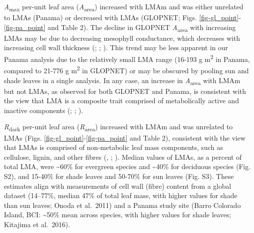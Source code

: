\documentclass[
  12pt,
  letterpaper,
  DIV=11,
  numbers=noendperiod]{scrartcl}
\begin{document}
\emph{A}\textsubscript{max} per-unit leaf area
(\emph{A}\textsubscript{area}) increased with LMAm and was either
unrelated to LMAs (Panama) or decreased with LMAs (GLOPNET; Figs.
\ref{fig-gl_point}-\ref{fig-pa_point} and Table 2). The decline in
GLOPNET \emph{A}\textsubscript{area} with increasing LMAs may be due to
decreasing mesophyll conductance, which decreases with increasing cell
wall thickness (;
;
). This trend may be
less apparent in our Panama analysis due to the relatively small LMA
range (16-193 g m\textsuperscript{2} in Panama, compared to 21-776 g
m\textsuperscript{2} in GLOPNET) or may be obscured by pooling sun and
shade leaves in a single analysis. In any case, an increase in
\emph{A}\textsubscript{area} with LMAm but not LMAs, as observed for
both GLOPNET and Panama, is consistent with the view that LMA is a
composite trait comprised of metabolically active and inactive
components (;
;
).

\emph{R}\textsubscript{dark} per-unit leaf area
(\emph{R}\textsubscript{area}) increased with LMAm and was unrelated to
LMAs (Figs. \ref{fig-gl_point}-\ref{fig-pa_point} and Table 2),
consistent with the view that LMAs is comprised of non-metabolic leaf
mass components, such as cellulose, lignin, and other fibres
(,
; ). Median values of LMAs, as a percent of total LMA, were
\textasciitilde60\% for evergreen species and \textasciitilde40\% for
deciduous species (Fig. S2), and 15-40\% for shade leaves and 50-70\%
for sun leaves (Fig. S3). These estimates align with measurements of
cell wall (fibre) content from a global dataset (14--77\%, median 47\%
of total leaf mass, with higher values for shade than sun leaves; Onoda
et al.~2011) and a Panama study site (Barro Colorado Island, BCI:
\textasciitilde50\% mean across species, with higher values for shade
leaves; Kitajima et al.~2016).
\end{document}
